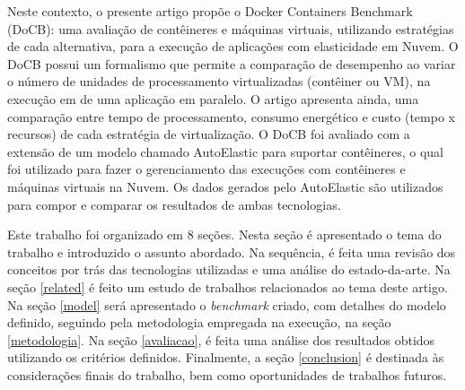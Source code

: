 \documentclass[twoside,english,brazilian]{UNISINOSartigo}
\begin{document}

Neste contexto, o presente artigo propõe o Docker Containers Benchmark (DoCB): uma avaliação de contêineres e máquinas virtuais, utilizando estratégias de cada alternativa, para a execução de aplicações com elasticidade em Nuvem. O DoCB possui um formalismo que permite a comparação de desempenho ao variar o número de unidades de processamento virtualizadas (contêiner ou VM), na execução em de uma aplicação em paralelo.
O artigo apresenta ainda, uma comparação entre tempo de processamento, consumo energético e custo (tempo x recursos) de cada estratégia de virtualização. O DoCB foi avaliado com a extensão de um modelo chamado AutoElastic  para suportar contêineres, o qual foi utilizado para fazer o gerenciamento das execuções com contêineres e máquinas virtuais na Nuvem. Os dados gerados pelo AutoElastic são utilizados para compor e comparar os resultados de ambas tecnologias. 

Este trabalho foi organizado em 8 seções. Nesta seção é apresentado o tema do trabalho e introduzido o assunto abordado. Na sequência, é feita uma revisão dos conceitos por trás das tecnologias utilizadas e uma análise do estado-da-arte. Na seção \ref{related} é feito um estudo de trabalhos relacionados ao tema deste artigo. Na seção \ref{model} será apresentado o \textit{benchmark} criado, com detalhes do modelo definido, seguindo pela metodologia empregada na execução, na seção \ref{metodologia}. Na seção \ref{avaliacao}, é feita uma análise dos resultados obtidos utilizando os critérios definidos. Finalmente, a seção \ref{conclusion} é destinada às considerações finais do trabalho, bem como oportunidades de trabalhos futuros.
\end{document}
